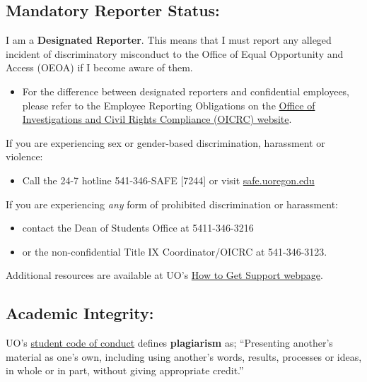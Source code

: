 \subsection*{Mandatory Reporter Status:}

I am a \textbf{Designated Reporter}.
This means that I must report any alleged incident of discriminatory misconduct to the Office of Equal Opportunity and Access (OEOA) if I become aware of them.

\begin{itemize}

\item For the difference between designated reporters and confidential employees, please refer to the Employee Reporting Obligations on the 
 \href{https://investigations.uoregon.edu/employee-responsibilities}{Office of Investigations and Civil Rights Compliance (OICRC) website}.

\end{itemize}

If you are experiencing sex or gender-based discrimination, harassment or violence:
\begin{itemize}
\item Call the 24-7 hotline 541-346-SAFE [7244] or visit \href{https://safe.uoregon.edu/}{safe.uoregon.edu}
\end{itemize}

If you are experiencing \textit{any} form of prohibited discrimination or harassment:
\begin{itemize}
\item contact the Dean of Students Office at 5411-346-3216
\item or the non-confidential Title IX Coordinator/OICRC at 541-346-3123.
\end{itemize}

Additional resources are available at UO’s \href{https://investigations.uoregon.edu/how-get-support}{How to Get Support webpage}.

\subsection*{Academic Integrity:}
UO's \href{https://policies.uoregon.edu/vol-3-administration-student-affairs/ch-1-conduct/student-conduct-code}{student code of conduct} defines \textbf{plagiarism} as;
``Presenting another’s material as one’s own, including using another’s words, results, processes or ideas,
  in whole or in part, without giving appropriate credit.''

